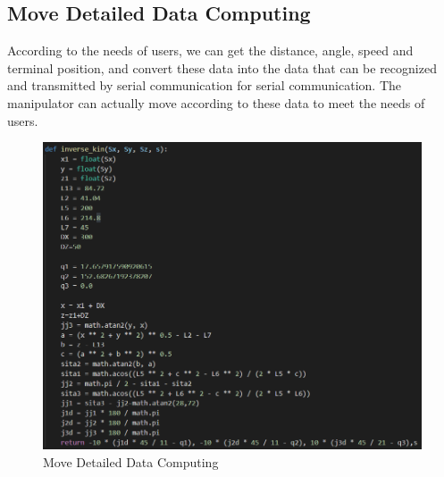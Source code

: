 \documentclass{hci}
\begin{document}
\subsection{Move Detailed Data Computing}
According to the needs of users, we can get the distance, angle, speed and terminal position, and convert these data into the data that can be recognized and transmitted by serial communication for serial communication. The manipulator can actually move according to these data to meet the needs of users.
\begin{figure}[htbp]
	\centering
	\includegraphics[width=0.9\linewidth]{figures/72}
	\caption{Move Detailed Data Computing}
	\label{fig:62}
\end{figure}
\end{document}
